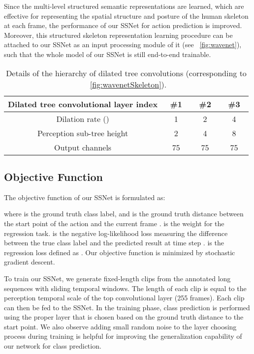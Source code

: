 \documentclass[10pt,twocolumn,letterpaper]{article}
\begin{document}
Since the multi-level structured semantic representations are learned,
which are effective for representing the spatial structure and posture of the human skeleton at each frame,
the performance of our SSNet for action prediction is improved.
Moreover, this structured skeleton representation learning procedure can be attached to our SSNet as an input processing module of it (see \figurename{~\ref{fig:wavenet}}),
such that the whole model of our SSNet is still end-to-end trainable.

\begin{table}[!tp]
\caption{Details of the hierarchy of dilated tree convolutions (corresponding to \figurename{~\ref{fig:wavenetSkeleton}}).}
\label{table:wavenetSkeletonDetails}
\centering
\small
\begin{tabular}{cccc}
\toprule
Dilated tree convolutional layer index   &   ~\#1~  &   ~\#2~ & ~\#3~   \\
\midrule
Dilation rate ()                    &     1    &     2   &   4  \\
Perception sub-tree height                   &     2    &     4   &   8   \\
Output channels                          &    75    &     75  &  75   \\
\bottomrule
\end{tabular}
\end{table}

\subsection{Objective Function}

The objective function of our SSNet is formulated as:

where  is the ground truth class label, and  is the ground truth distance between the start point of the action and the current frame .
 is the weight for the regression task.
 is the negative log-likelihood loss measuring the difference between the true class label  and the predicted result  at time step .
 is the regression loss defined as .
Our objective function is minimized by stochastic gradient descent.

To train our SSNet, we generate fixed-length clips from the annotated long sequences with sliding temporal windows.
The length of each clip is equal to the perception temporal scale of the top convolutional layer (255 frames).
Each clip can then be fed to the SSNet.
In the training phase,
class prediction is performed using the proper layer that is chosen based on the ground truth distance to the start point.
We also observe adding small random noise to the layer choosing process during training is helpful for improving the generalization capability of our network for class prediction.
\end{document}
